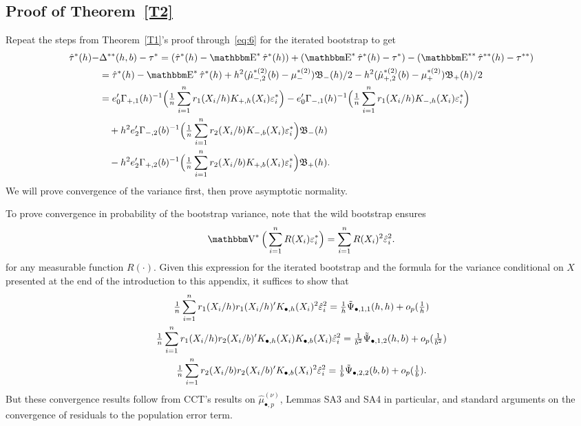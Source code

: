 \documentclass[12pt,fleqn]{article}
\begin{document}
\subsection{Proof of Theorem~\ref{T2}}
Repeat the steps from Theorem~\ref{T1}'s proof through~\eqref{eq:6} for
the iterated bootstrap to get
\begin{align*}
  \hat\tau^{*}(h) - &\Delta^{**}(h,b) - \tau^*
  = (\hat\tau^*(h) - \E^* \hat \tau^*(h)) +
  (\E^* \hat \tau^*(h) - \tau^*) - (\E^{**} \hat \tau^{**}(h) - \tau^{**}) \\
  &= \hat\tau^*(h) - \E^*\hat\tau^*(h)
   + h^2 (\hat\mu_{-,2}^{*(2)}(b) - \mu_-^{*(2)}) \Bf_{-}(h) /2
   - h^2 (\hat\mu_{+,2}^{*(2)}(b) - \mu_+^{*(2)}) \Bf_{+}(h) / 2 \\
  &= e_0' \Gamma_{+,1}(h)^{-1} \Big(\tfrac{1}{n}
  \sum_{i=1}^n r_1(X_i/h) K_{+,h}(X_i) \varepsilon_i^*\Big)
   - e_0' \Gamma_{-,1}(h)^{-1} \Big(\tfrac{1}{n}
  \sum_{i=1}^n r_1(X_i/h) K_{-,h}(X_i) \varepsilon_i^*\Big) \\
  &\quad + h^2 e_2' \Gamma_{-,2}(b)^{-1}
    \Big(\tfrac{1}{n} \sum_{i=1}^n r_2(X_i/b) K_{-,b}(X_i) \varepsilon_i^* \Big) \Bf_-(h) \\
  &\quad - h^2 e_2' \Gamma_{+,2}(b)^{-1}
    \Big(\tfrac{1}{n} \sum_{i=1}^n r_2(X_i/b) K_{+,b}(X_i) \varepsilon_i^*\Big) \Bf_+(h).
\end{align*}
We will prove convergence of the variance first, then prove asymptotic
normality.

To prove convergence in probability of the bootstrap variance, note that the
wild bootstrap ensures
\begin{equation*}
  \V^*\Big(\sum_{i=1}^n R(X_i) \varepsilon_i^*\Big)
  = \sum_{i=1}^n R(X_i)^2 \hat\varepsilon_i^2.
\end{equation*}
for any measurable function $R(\cdot)$.
Given this expression for the iterated bootstrap and the formula for the
variance conditional on $X$ presented at the end of the introduction to this
appendix, it suffices to show that
\begin{gather}
  \tfrac{1}{n} \sum_{i=1}^n r_1(X_i/h) r_1(X_i/h)' K_{\bullet,h}(X_i)^2
  \hat\varepsilon_i^2 = \tfrac{1}{h} \tilde{\Psi}_{\bullet,1,1}(h,h) + o_p(\tfrac{1}{h})
  \label{eq:3} \\
  \tfrac{1}{n} \sum_{i=1}^n r_1(X_i/h) r_2(X_i/b)' K_{\bullet,h}(X_i)
  K_{\bullet,b}(X_i) \hat\varepsilon_i^2 = \tfrac{1}{b^2} \tilde{\Psi}_{\bullet,1,2}(h,b)
  + o_p(\tfrac{1}{b^2})
  \label{eq:5} \\
  \tfrac{1}{n} \sum_{i=1}^n r_2(X_i/b) r_2(X_i/b)' K_{\bullet,b}(X_i)^2
  \hat\varepsilon_i^2 = \tfrac{1}{b} \tilde{\Psi}_{\bullet,2,2}(b,b) + o_p(\tfrac{1}{b}).
  \label{eq:7}
\end{gather}
But these convergence results follow from CCT's results on
$\hat\mu_{\bullet,p}^{(\nu)}$, Lemmas SA3 and SA4 in particular,
and standard arguments on the convergence of residuals to
the population error term.
\end{document}
